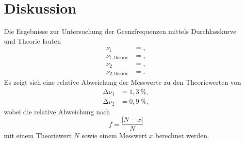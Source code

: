 \section{Diskussion}
\label{sec:Diskussion}

Die Ergebnisse zur Untersuchung der Grenzfrequenzen mittels Durchlasskurve und Theorie lauten
\begin{align*}
  \nu_{1} &= , \\
  \nu_{1, \text{theorie}} &= , \\
  \nu_{2} &= , \\
  \nu_{2, \text{theorie}} &= .
\end{align*}
Es zeigt sich eine relative Abweichung der Messwerte zu den Theoriewerten von
\begin{align*}
  \increment\nu_{1} &= 1,3\:\%, \\
  \increment\nu_{2} &= 0,9\:\%,
\end{align*}
wobei die relative Abweichung nach
\begin{equation}
f = \frac{\lvert N - x \rvert }{N}
\label{eqn:rel_err}
\end{equation}
mit einem Theoriewert $N$ sowie einem Messwert $x$ berechnet werden.\\


